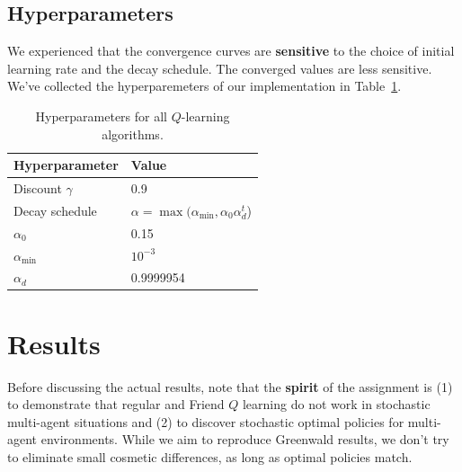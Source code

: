 \documentclass[conference]{IEEEtran}
\begin{document}
\subsection{Hyperparameters}
We experienced that the convergence curves are {\bf sensitive} to the choice of initial learning rate and the decay schedule. The converged values are less sensitive. We've collected the hyperparemeters of our implementation in Table~\ref{tab:hyper}.
\begin{table}[!h]
\begin{center}
\begin{tabular}{|l|l|}
\hline
Hyperparameter & Value\\ \hline 
Discount $\gamma$ & 0.9\\
Decay schedule & $\alpha = \max(\alpha_{\text{min}}, \alpha_0\alpha_d^t$) \\
$\alpha_0$ & 0.15 \\
$\alpha_{\text{min}}$ & $10^{-3}$ \\ 
$\alpha_d$ & 0.9999954 \\ \hline
\end{tabular}
\end{center}
\caption{Hyperparameters for all $Q$-learning algorithms. \label{tab:hyper}}
\end{table}
\section{Results}
Before discussing the actual results, note that the {\bf spirit} of the assignment is (1) to demonstrate that regular and Friend $Q$ learning do not work in stochastic multi-agent situations and (2) to discover stochastic optimal policies for multi-agent environments. While we aim to reproduce Greenwald results, we don't try to eliminate small cosmetic differences, as long as optimal policies match.
\end{document}
